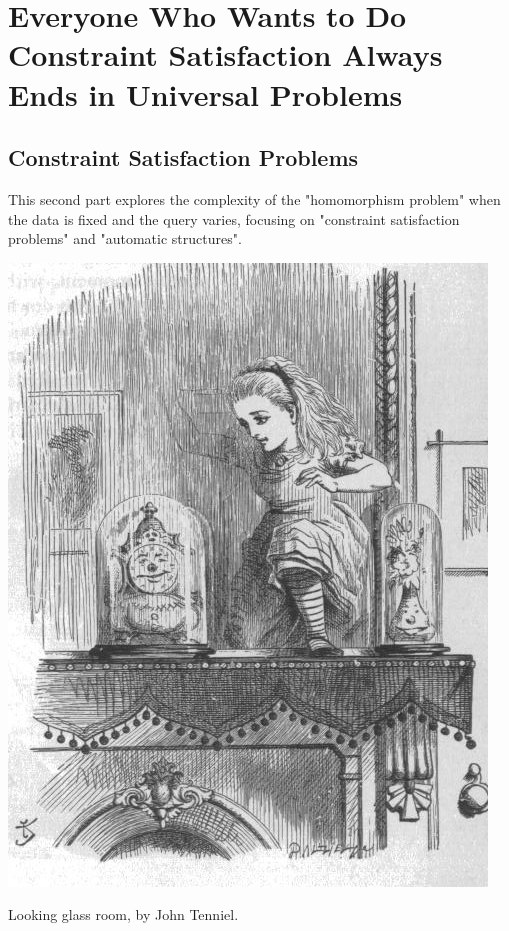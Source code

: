 \section{Everyone Who Wants to Do Constraint Satisfaction Always Ends in Universal Problems}
\label{sec:intro-universal}

\subsection{Constraint Satisfaction Problems}

This second part explores the complexity of the "homomorphism problem" when the data is fixed and the query varies, focusing on "constraint satisfaction problems" and "automatic structures".

\begin{marginfigure}[-15em]
	\centering
	\includegraphics[width=\linewidth]{fig/intro/aliceroom2.jpg}
	\caption{Looking glass room, by John Tenniel.}
\end{marginfigure}

